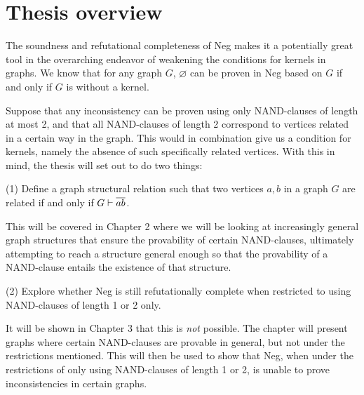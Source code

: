 \section{Thesis overview}
\label{sec:Thesis overview}
The soundness and refutational completeness of Neg makes it a potentially great tool in the overarching endeavor of weakening the conditions for kernels in graphs.
We know that for any graph $G$, $\varnothing$ can be proven in Neg based on $G$ if and only if $G$ is without a kernel.

Suppose that any inconsistency can be proven using only NAND-clauses of length at most 2, and that all NAND-clauses of length 2 correspond to vertices related in a certain way in the graph.
This would in combination give us a condition for kernels, namely the absence of such specifically related vertices.
With this in mind, the thesis will set out to do two things:

(1) Define a graph structural relation such that two vertices $a,b$ in a graph $G$ are related if and only if $G \vdash \ol{ab}$.

This will be covered in Chapter 2 where we will be looking at increasingly general graph structures that ensure the provability of certain NAND-clauses, ultimately attempting to reach a structure general enough so that the provability of a NAND-clause entails the existence of that structure.

(2) Explore whether Neg is still refutationally complete when restricted to using NAND-clauses of length 1 or 2 only.

It will be shown in Chapter 3 that this is \textit{not} possible.
The chapter will present graphs where certain NAND-clauses are provable in general, but not under the restrictions mentioned.
This will then be used to show that Neg, when under the restrictions of only using NAND-clauses of length 1 or 2, is unable to prove inconsistencies in certain graphs.
